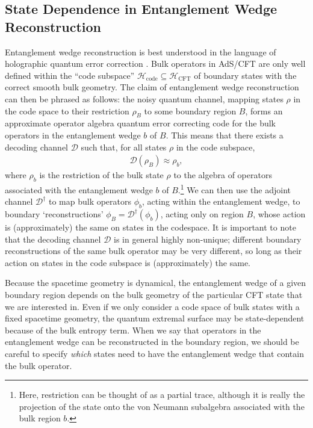 \documentclass[12pt]{article}
\begin{document}
\subsection{State Dependence in Entanglement Wedge Reconstruction} \label{sec:abits}
Entanglement wedge reconstruction is best understood in the language of holographic quantum error correction \cite{almheiri2015bulk}. Bulk operators in AdS/CFT are only well defined within the ``code subspace'' $\mathcal{H}_{\text{code}} \subseteq \mathcal{H}_\text{CFT}$ of boundary states with the correct smooth bulk geometry. The claim of entanglement wedge reconstruction can then be phrased as follows:  the noisy quantum channel, mapping states $\rho$ in the code space to their restriction $\rho_B$ to some boundary region $B$, forms an approximate operator algebra quantum error correcting code for the bulk operators in the entanglement wedge $b$ of $B$. This means that there exists a decoding channel $\mathcal{D}$ such that, for all states $\rho$ in the code subspace,
\begin{align}
\mathcal{D} (\rho_B) \approx \rho_b,
\end{align}
where $\rho_b$ is the restriction of the bulk state $\rho$ to the algebra of operators associated with the entanglement wedge $b$ of $B$.\footnote{Here, restriction can be thought of as a partial trace, although it is really the projection of the state onto the von Neumann subalgebra associated with the bulk region $b$.} We can then use the adjoint channel $\mathcal{D}^\dagger$ to map bulk operators $\phi_b$, acting within the entanglement wedge, to boundary `reconstructions' $\phi_B = \mathcal{D}^\dagger (\phi_b)$, acting only on region $B$, whose action is (approximately) the same on states in the codespace. It is important to note that the decoding channel $\mathcal{D}$ is in general highly non-unique; different boundary reconstructions of the same bulk operator may be very different, so long as their action on states in the code subspace is (approximately) the same.

Because the spacetime geometry is dynamical, the entanglement wedge of a given boundary region depends on the bulk geometry of the particular CFT state that we are interested in. Even if we only consider a code space of bulk states with a fixed spacetime geometry, the quantum extremal surface may be state-dependent because of the bulk entropy term. When we say that operators in the entanglement wedge can be reconstructed in the boundary region, we should be careful to specify \emph{which} states need to have the entanglement wedge that contain the bulk operator.
\end{document}
